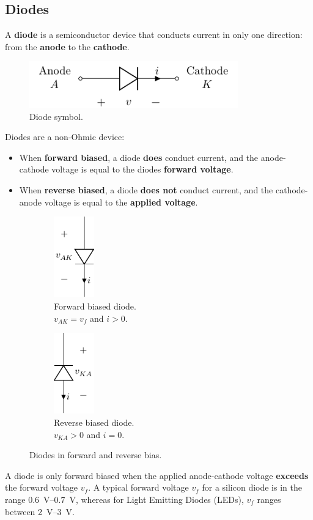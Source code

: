 \documentclass[a4paper]{report}
\begin{document}
\subsection{Diodes}
A \textbf{diode} is a semiconductor device that conducts current in
only one direction: from the \textbf{anode} to the \textbf{cathode}.
\begin{figure}[H]
    \centering
    \includegraphics[height = 2cm, keepaspectratio = true]{figures/diode.pdf}
    \caption{Diode symbol.} %
\end{figure}
Diodes are a non-Ohmic device:
\begin{itemize}
    \item When \textbf{forward biased}, a diode \textbf{does} conduct current, and the anode-cathode voltage
          is equal to the diodes \textbf{forward voltage}.
    \item When \textbf{reverse biased}, a diode \textbf{does not} conduct current, and the cathode-anode voltage
          is equal to the \textbf{applied voltage}.
\end{itemize}
\begin{figure}[H]
    \centering
    \begin{subfigure}{0.47\linewidth}
        \centering
        \includegraphics[height=3.5cm]{figures/diode_forward_bias.pdf}
        \caption{Forward biased diode. \\\(v_{AK} = v_f\) and \(i > 0\).}
    \end{subfigure}
    \begin{subfigure}{0.47\linewidth}
        \centering
        \includegraphics[height=3.5cm]{figures/diode_reverse_bias.pdf}
        \caption{Reverse biased diode. \\\(v_{KA} > 0\) and \(i = 0\).}
    \end{subfigure}
    \caption{Diodes in forward and reverse bias.}
\end{figure}
A diode is only forward biased when the applied anode-cathode voltage \textbf{exceeds} the forward voltage \(v_f\).
A typical forward voltage \(v_f\) for a silicon diode is in the range \qtyrange{0.6}{0.7}{V}, whereas for
Light Emitting Diodes (LEDs), \(v_f\) ranges between \qtyrange{2}{3}{V}.
\end{document}
